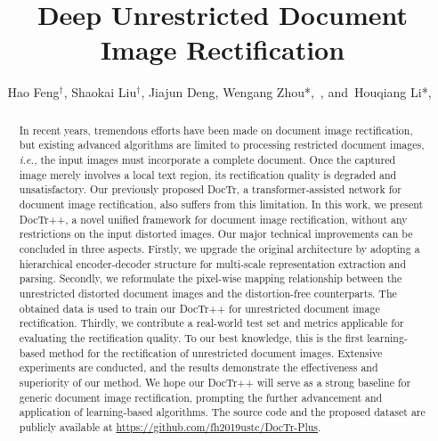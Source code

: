 \documentclass[lettersize,journal]{IEEEtran}
\begin{document}
\title{Deep Unrestricted Document Image Rectification}

\author{Hao Feng$^{\dagger}$,
 Shaokai Liu$^{\dagger}$,
 Jiajun Deng,
 Wengang Zhou*,~,  and~Houqiang Li*,~}





\maketitle

\begin{abstract}
In recent years, tremendous efforts have been made on document image rectification, 
but existing advanced algorithms are limited to processing restricted document images, 
\emph{i.e.}, the input images must incorporate a complete document. 
Once the captured image merely involves a local text region,
its rectification quality is degraded and unsatisfactory. 
Our previously proposed DocTr, a transformer-assisted network for document image rectification, also suffers from this limitation.
In this work, we present DocTr++, 
a novel unified framework for document image rectification,
without any restrictions on the input distorted images.
Our major technical improvements can be concluded in three aspects.
Firstly,
we upgrade the original architecture by adopting a hierarchical encoder-decoder structure for multi-scale representation extraction and parsing.
Secondly,
we reformulate the pixel-wise mapping relationship between the unrestricted distorted document images and the distortion-free counterparts.
The obtained data is used to train our DocTr++ for unrestricted document image rectification.
Thirdly, we contribute a real-world test set and metrics applicable for evaluating the rectification quality.
To our best knowledge, this is the first learning-based method for the rectification of unrestricted document images.
Extensive experiments are conducted, 
and the results demonstrate the effectiveness and superiority of our method.
We hope our DocTr++ will serve as a strong baseline for generic document image rectification,
prompting the further advancement and application of learning-based algorithms.
The source code and the proposed dataset are publicly available at \url{https://github.com/fh2019ustc/DocTr-Plus}.
\end{abstract}
\end{document}
